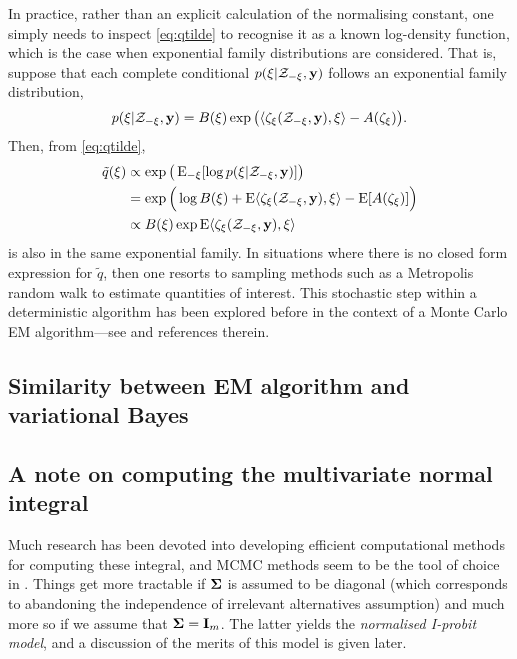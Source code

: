 In practice, rather than an explicit calculation of the normalising constant, one simply needs to inspect \cref{eq:qtilde} to recognise it as a known log-density function, which is the case when exponential family distributions are considered.
That is, suppose that each complete conditional $p(\xi|{\mathcal Z}_{-\xi}, {\mathbf y})$ follows an exponential family distribution,
\[
  p(\xi|{\mathcal Z}_{-\xi}, {\mathbf y}) = B(\xi)\exp \big(\langle\zeta_\xi({\mathcal Z}_{-\xi}, {\mathbf y}) , \xi\rangle - A(\zeta_\xi) \big).
\]
Then, from \cref{eq:qtilde},
\begin{align*}
  \tilde q(\xi)
  &\propto \exp\big(\operatorname{E}_{-\xi}[\log p(\xi|{\mathcal Z}_{-\xi}, {\mathbf y})] \big) \\
  &= \exp \Big(\log B(\xi) + \operatorname{E} \langle\zeta_\xi({\mathcal Z}_{-\xi}, {\mathbf y}) , \xi\rangle - \operatorname{E} [ A(\zeta_\xi) ] \Big) \\
  &\propto B(\xi)\exp \operatorname{E}\langle\zeta_\xi({\mathcal Z}_{-\xi}, {\mathbf y}) , \xi\rangle
\end{align*}
is also in the same exponential family.
In situations where there is no closed form expression for $\tilde q$, then one resorts to sampling methods such as a Metropolis random walk to estimate quantities of interest.
This stochastic step within a deterministic algorithm has been explored before in the context of a Monte Carlo EM algorithm---see \citet[§4, pp. 537--538]{meng1997algorithm} and references therein.

\subsection{Similarity between EM algorithm and variational Bayes}


\subsection{A note on computing the multivariate normal integral}
\label{misc:mnint}


Much research has been devoted into developing efficient computational methods for computing these integral, and MCMC methods seem to be the tool of choice in \citep{mcculloch1994exact,nobile1998hybrid,mcculloch2000bayesian}.
Things get more tractable if ${\bm\Sigma}$ is assumed to be diagonal (which corresponds to abandoning the independence of irrelevant alternatives assumption) and much more so if we assume that ${\bm\Sigma} = {\mathbf I}_m$.
The latter yields the \emph{normalised I-probit model}, and a discussion of the merits of this model is given later.









